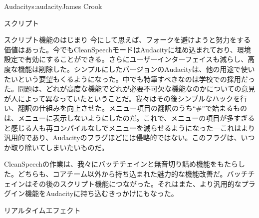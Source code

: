 \begin{aosachapter}{Audacity}{s:audacity}{James Crook}
\begin{aosasect1}{スクリプト}
\begin{aosabox}{スクリプト機能のはじまり}
今にして思えば、フォークを避けようと努力をする価値はあった。今でもCleanSpeechモードはAudacityに埋め込まれており、環境設定で有効にすることができる。さらにユーザーインターフェイスも減らし、高度な機能は削除した。シンプルにしたバージョンのAudacityは、他の用途で使いたいという要望もくるようになった。中でも特筆すべきなのは学校での採用だった。問題は、どれが高度な機能でどれが必要不可欠な機能なのかについての意見が人によって異なっていたということだ。我々はその後シンプルなハックを行い、翻訳の仕組みを向上させた。メニュー項目の翻訳のうち``\#''で始まるものは、メニューに表示しないようにしたのだ。これで、メニューの項目が多すぎると感じる人も再コンパイルなしでメニューを減らせるようになった---これはより汎用的であり、Audacityのフラグほどには侵略的ではない。このフラグは、いつか取り除いてしまいたいものだ。

CleanSpeechの作業は、我々にバッチチェインと無音切り詰め機能をもたらした。どちらも、コアチーム以外から持ち込まれた魅力的な機能改善だ。バッチチェインはその後のスクリプト機能につながった。それはまた、より汎用的なプラグイン機能をAudacityに持ち込むきっかけにもなった。

\end{aosabox}

\end{aosasect1}

\begin{aosasect1}{リアルタイムエフェクト}


\end{aosasect1}
\end{aosachapter}
